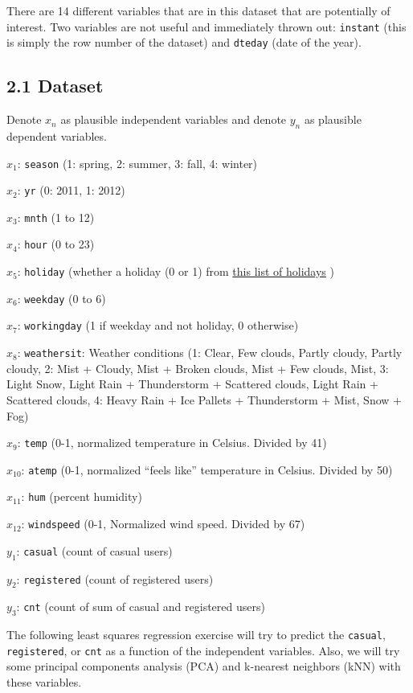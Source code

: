 \documentclass[
]{article}
\begin{document}
There are 14 different variables that are in this dataset that are potentially of interest. Two variables are not useful and immediately thrown out: \texttt{instant} (this is simply the row number of the dataset) and \texttt{dteday} (date of the year).

\hypertarget{Dataset}{%
\subsection{2.1 Dataset}\label{Dataset}}
Denote \(x_{n}\) as plausible independent variables and denote \(y_{n}\)
as plausible dependent variables.

\(x_{1}\): \texttt{season} (1: spring, 2: summer, 3: fall, 4: winter)

\(x_{2}\): \texttt{yr} (0: 2011, 1: 2012)

\(x_{3}\): \texttt{mnth} (1 to 12)

\(x_{4}\): \texttt{hour} (0 to 23)

\(x_{5}\): \texttt{holiday} (whether a holiday (0 or 1) from
\color{blue}
\href{https://dchrc.dc.gov/page/holiday-schedule}{this list of holidays}
\color{black} )

\(x_{6}\): \texttt{weekday} (0 to 6)

\(x_{7}\): \texttt{workingday} (1 if weekday and not holiday, 0
otherwise)

\(x_{8}\): \texttt{weathersit}: Weather conditions (1: Clear, Few
clouds, Partly cloudy, Partly cloudy, 2: Mist + Cloudy, Mist + Broken
clouds, Mist + Few clouds, Mist, 3: Light Snow, Light Rain +
Thunderstorm + Scattered clouds, Light Rain + Scattered clouds, 4: Heavy
Rain + Ice Pallets + Thunderstorm + Mist, Snow + Fog)

\(x_{9}\): \texttt{temp} (0-1, normalized temperature in Celsius.
Divided by 41)

\(x_{10}\): \texttt{atemp} (0-1, normalized ``feels like'' temperature
in Celsius. Divided by 50)

\(x_{11}\): \texttt{hum} (percent humidity)

\(x_{12}\): \texttt{windspeed} (0-1, Normalized wind speed. Divided by
67)

\(y_{1}\): \texttt{casual} (count of casual users)

\(y_{2}\): \texttt{registered} (count of registered users)

\(y_{3}\): \texttt{cnt} (count of sum of casual and registered users)

The following least squares regression exercise will try to predict the
\texttt{casual}, \texttt{registered}, or \texttt{cnt} as a function of
the independent variables. Also, we will try some principal components
analysis (PCA) and k-nearest neighbors (kNN) with these variables.
\end{document}
